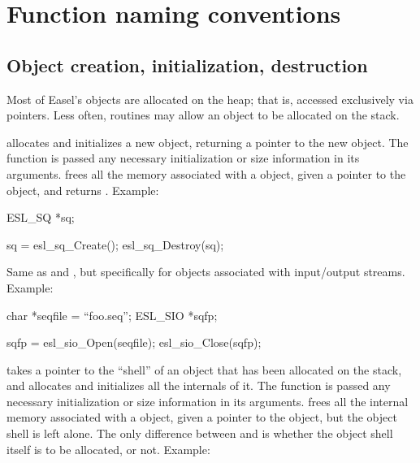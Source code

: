 \section{Function naming conventions}

\subsection{Object creation, initialization, destruction}

Most of Easel's objects are allocated on the heap; that is, accessed
exclusively via pointers. Less often, routines may allow an object to
be allocated on the stack.

\begin{sreitems}{}
\item [\ccode{Create,Destroy}] 
   allocates and initializes a new 
  object, returning a pointer to the new
  object. The  function is passed any necessary
  initialization or size information in its arguments.
   frees all the memory associated
  with a  object,  given a pointer to the object,
  and returns . Example:

\begin{cchunk}
ESL_SQ *sq;

sq = esl_sq_Create();
esl_sq_Destroy(sq);
\end{cchunk}
  
\item [\ccode{Open,Close}] 
  Same as  and , but specifically for
  objects associated with input/output streams. Example:

\begin{cchunk}
char        *seqfile = ``foo.seq'';
ESL_SIO     *sqfp;

sqfp = esl_sio_Open(seqfile);
esl_sio_Close(sqfp);
\end{cchunk}


\item [\ccode{Inflate,Deflate}]
   takes a pointer to the ``shell'' of an
   object that has been allocated on the stack, and
  allocates and initializes all the internals of it. The
   function is passed any necessary initialization or
  size information in its arguments.  
  frees all the internal memory associated with a  object,
  given a pointer to the object, but the object shell is left alone.
  The only difference between  and
   is whether the object shell itself is to be
  allocated, or not. Example:


\end{sreitems}
